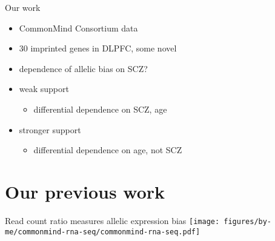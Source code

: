\documentclass[usenames,dvipsnames]{beamer} %
\begin{document}
\begin{frame}{Our   work}
\begin{itemize}
\item<1> CommonMind Consortium data
\item<1> 30 imprinted genes in DLPFC, some novel
\item<1> dependence of allelic bias on SCZ? 
\item<1> weak support
\begin{itemize}
\item  differential dependence on SCZ, age
\end{itemize}
\item<2> stronger support
\begin{itemize}
\item  differential dependence on age, \alert{not} SCZ
\end{itemize}
\end{itemize}
\end{frame}

\section{Our previous work}

\begin{frame}{Read count ratio measures allelic expression bias}
\texttt{[image: figures/by-me/commonmind-rna-seq/commonmind-rna-seq.pdf]}
\end{frame}
\end{document}

